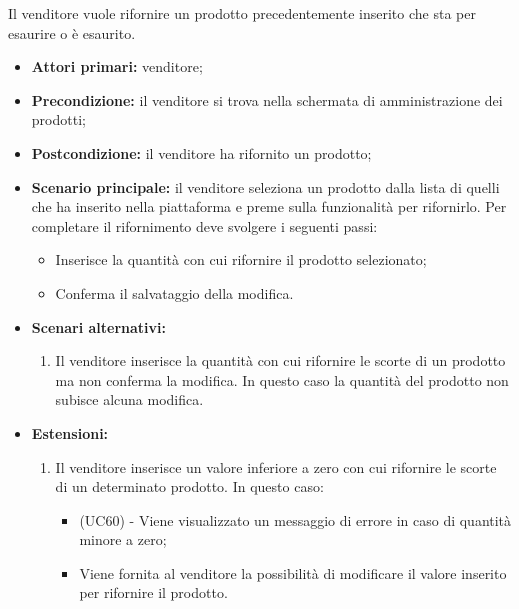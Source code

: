 Il venditore vuole rifornire un prodotto precedentemente inserito che sta per esaurire o è esaurito.
\begin{itemize}
    \item \textbf{Attori primari:} venditore;
    \item \textbf{Precondizione:} il venditore si trova nella schermata di amministrazione dei prodotti;
    \item \textbf{Postcondizione:} il venditore ha rifornito un prodotto;
    \item \textbf{Scenario principale:} il venditore seleziona un prodotto dalla lista di quelli che ha inserito nella piattaforma e preme sulla funzionalità per rifornirlo. Per completare il rifornimento deve svolgere i seguenti passi:
    \begin{itemize}
        \item Inserisce la quantità con cui rifornire il prodotto selezionato;
        \item Conferma il salvataggio della modifica.
    \end{itemize}
	\item \textbf{Scenari alternativi:}
	\begin{enumerate}[label=\lett]
		\item Il venditore inserisce la quantità con cui rifornire le scorte di un prodotto ma non conferma la modifica. In questo caso la quantità del prodotto non subisce alcuna modifica.
	\end{enumerate}
	\item \textbf{Estensioni:}
	\begin{enumerate}[label=\lett]
		\item Il venditore inserisce un valore inferiore a zero con cui rifornire le scorte di un determinato prodotto. In questo caso:
		\begin{itemize}
			\item (UC60) - Viene visualizzato un messaggio di errore in caso di quantità minore a zero;
			\item Viene fornita al venditore la possibilità di modificare il valore inserito per rifornire il prodotto.
		\end{itemize}
	\end{enumerate}
\end{itemize}

